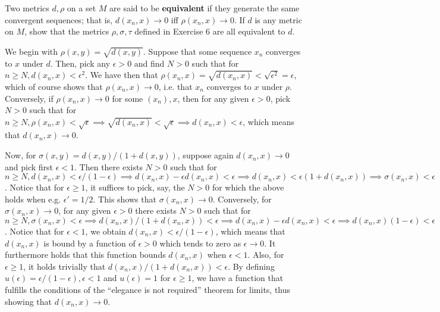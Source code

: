 \begin{exercise}{42}
    Two metrics $d, \rho$ on a set $M$ are said to be \textbf{equivalent} if they generate the same convergent sequences; that is, $d(x_n, x) \rightarrow 0$ iff $\rho(x_n, x) \rightarrow 0$.
    If $d$ is any metric on $M$, show that the metrics $\rho, \sigma, \tau$ defined in Exercise 6 are all equivalent to $d$.
\end{exercise}

\begin{solution}
    
    We begin with $\rho(x, y) = \sqrt{d(x, y)}$.
    Suppose that some sequence $x_n$ converges to $x$ under $d$. 
    Then, pick any $\epsilon > 0$ and find $N > 0$ such that for $n \geq N, d(x_n, x) < \epsilon^2$.
    We have then that $\rho(x_n, x) = \sqrt{d(x_n, x)} < \sqrt{\epsilon^2} = \epsilon$, which of course shows that $\rho(x_n, x) \rightarrow 0$, i.e. that $x_n$ converges to $x$ under $\rho$.
    Conversely, if $\rho(x_n, x) \rightarrow 0$ for some $(x_n), x$, then for any given $\epsilon > 0$, pick $N > 0$ such that for $n \geq N, \rho(x_n, x) < \sqrt{\epsilon} \implies \sqrt{d(x_n, x)} < \sqrt{\epsilon}\implies d(x_n, x) < \epsilon$, which means that $d(x_n, x) \rightarrow 0$.

    Now, for $\sigma(x, y) = d(x, y)/(1 + d(x, y))$, suppose again $d(x_n, x) \rightarrow 0$ and pick first $\epsilon < 1$.
    Then there exists $N > 0$ such that for $n \geq N, d(x_n, x) < \epsilon/(1 - \epsilon) \implies d(x_n, x) - \epsilon d(x_n, x) < \epsilon \implies d(x_n, x) < \epsilon (1 + d(x_n, x)) \implies \sigma(x_n, x) < \epsilon$.
    Notice that for $\epsilon \geq 1$, it suffices to pick, say, the $N > 0$ for which the above holds when e.g. $\epsilon' = 1/2$. 
    This shows that $\sigma(x_n, x) \rightarrow 0$.
    Conversely, for $\sigma(x_n, x) \rightarrow 0$, for any given $\epsilon > 0$ there exists $N > 0$ such that for $n \geq N, \sigma(x_n, x) < \epsilon \implies d(x_n, x)/(1 + d(x_n, x)) < \epsilon \implies d(x_n, x) - \epsilon d(x_n, x) < \epsilon \implies d(x_n, x) (1 - \epsilon) < \epsilon$.
    Notice that for $\epsilon < 1$, we obtain $d(x_n, x) < \epsilon/(1 - \epsilon)$, which means that $d(x_n, x)$ is bound by a function of $\epsilon > 0$ which tends to zero as $\epsilon \rightarrow 0$.
    It furthermore holds that this function bounds $d(x_n, x)$ when $\epsilon < 1$.
    Also, for $\epsilon \geq 1$, it holds trivially that $d(x_n, x)/(1 + d(x_n, x))  < \epsilon$.
     By defining $u(\epsilon) = \epsilon/(1 - \epsilon), \epsilon < 1$ and $u(\epsilon) = 1$ for $\epsilon \geq 1$, we have a function that fulfills the conditions of the ``elegance is not required'' theorem for limits, thus showing that $d(x_n, x) \rightarrow 0$.


\end{solution}

